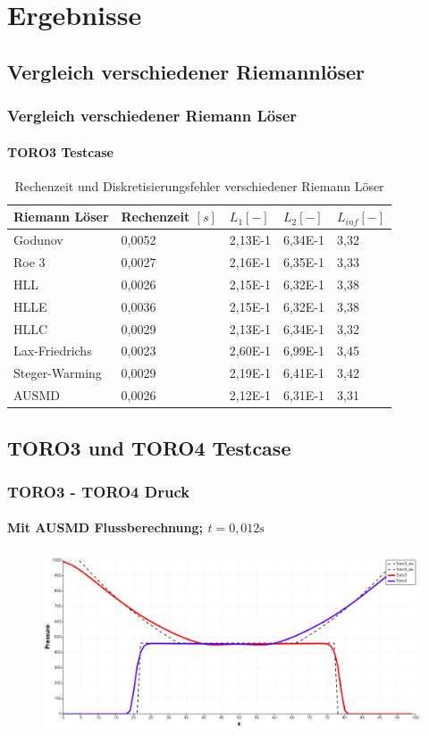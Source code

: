\documentclass[
	11pt, %
	aspectratio=169, %
]{beamer}
\begin{document}
\section{Ergebnisse}

\subsection{Vergleich verschiedener Riemannlöser}
\begin{frame}
	\frametitle{Vergleich verschiedener Riemann Löser}
	\framesubtitle{TORO3 Testcase} %
	
		\begin{table}
			\begin{tabular}{l l l l l}
				\toprule
				Riemann Löser & Rechenzeit $[s]$ & $L_1 [-]$& $L_2 [-]$& $L_{inf} [-]$\\
				\midrule
				Godunov & 0,0052 & 2,13E-1 & 6,34E-1 & 3,32 \\
				Roe 3 & 0,0027 & 2,16E-1 & 6,35E-1 & 3,33 \\
				HLL & 0,0026 & 2,15E-1 & 6,32E-1 & 3,38 \\
				HLLE & 0,0036 & 2,15E-1 & 6,32E-1 & 3,38 \\
				HLLC & 0,0029 & 2,13E-1 & 6,34E-1 & 3,32 \\
				Lax-Friedrichs & 0,0023 & 2,60E-1 & 6,99E-1 & 3,45 \\
				Steger-Warming & 0,0029 & 2,19E-1 & 6,41E-1 & 3,42 \\
				AUSMD & 0,0026 & 2,12E-1 & 6,31E-1 & 3,31\\
				\bottomrule
			\end{tabular}
			\caption{Rechenzeit und Diskretisierungsfehler verschiedener Riemann Löser}
	\end{table}
\end{frame}

\subsection{TORO3 und TORO4 Testcase}

\begin{frame}
	\frametitle{TORO3 - TORO4 Druck}
	\framesubtitle{Mit AUSMD Flussberechnung; $t=0,012 \mathrm{s}$}
	\begin{figure}
		\includegraphics[width=0.9\linewidth]{Toro3Toro4.png}
	\end{figure}
	

\end{frame}
\end{document}
